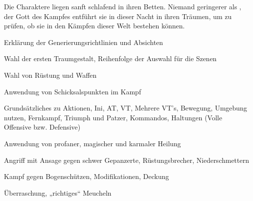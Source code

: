 \begin{center}
\end{center}

Die Charaktere liegen sanft schlafend in ihren Betten. Niemand geringerer als , der Gott des Kampfes entführt sie in dieser Nacht in ihren Träumen, um zu prüfen, ob sie in den Kämpfen dieser Welt bestehen können.


Erklärung der Generierungsrichtlinien und Absichten

Wahl der ersten Traumgestalt, Reihenfolge der Auswahl für die Szenen

Wahl von Rüstung und Waffen

Anwendung von Schicksalspunkten im Kampf

\spaltenende
{}
\neueseite
\spaltenanfang

Grundsätzliches zu Aktionen, Ini, AT, VT, Mehrere VT’s, Bewegung, Umgebung nutzen, Fernkampf, Triumph und Patzer, Kommandos, Haltungen (Volle Offensive bzw. Defensive)

\neueseite 

Anwendung von profaner, magischer und karmaler Heilung



Angriff mit Ansage gegen schwer Gepanzerte, Rüstungsbrecher, Niederschmettern

\spaltenende

\neueseite


\spaltenanfang
{}
Kampf gegen Bogenschützen, Modifikationen, Deckung

\neueseite

Überraschung, „richtiges“ Meucheln

